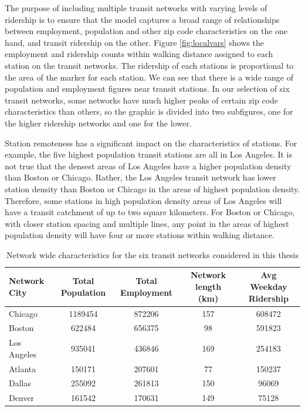 \documentclass[11pt]{report}
\begin{document}
The purpose of including multiple transit networks with varying levels of ridership is to ensure that the model captures a broad range of relationships between employment, population and other zip code characteristics on the one hand, and transit ridership on the other. Figure \ref{fig:localvars} shows the employment and ridership counts within walking distance assigned to each station on the transit networks. The ridership of each stations is proportional to the area of the marker for each station. We can see that there is a wide range of population and employment figures near transit stations. In our selection of six transit networks, some networks have much higher peaks of certain zip code characteristics than others, so the graphic is divided into two subfigures, one for the higher ridership networks and one for the lower. 

Station remoteness has a significant impact on the characteristics of stations. For example, the five highest population transit stations are all in Los Angeles. It is not true that the densest areas of Los Angeles have a higher population density than Boston or Chicago. Rather, the Los Angeles transit network has lower station density than Boston or Chicago in the areas of highest population density. Therefore, some stations in high population density areas of Los Angeles will have a transit catchment of up to two square kilometers. For Boston or Chicago, with closer station spacing and multiple lines, any point in the areas of highest population density will have four or more stations within walking distance.  

\begin{table}
\centering\begingroup\fontsize{10}{10}\selectfont
\begin{tabular}{l|cccc}
\toprule Network City&Total Population&Total Employment&Network length (km)&Avg Weekday Ridership \\ 
\midrule Chicago&1189454&872206&157&608472\\
Boston&622484&656375&98&591823\\
Los Angeles&935041&436846&169&254183\\
Atlanta&150171&207601&77&150237\\
Dallas&255092&261813&150&96069\\
Denver&161542&170631&149&75128\\
\bottomrule
\end{tabular}\endgroup
\caption{Network wide characteristics for the six transit networks considered in this thesis}\label{tab:netsize}
\end{table}
\end{document}
